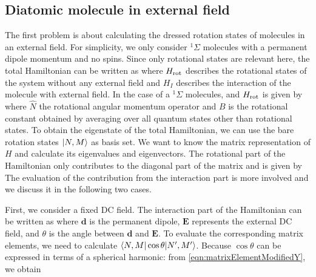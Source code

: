 \subsection{Diatomic molecule in external field}
\label{sec:moleculeInField}
The first problem is about calculating the dressed rotation states of molecules in an external field. For simplicity, we 
only consider $^1\Sigma$ molecules with a permanent dipole momentum and no spins. Since only rotational states are
relevant here, the total Hamiltonian can be written as
where $H_{\rm rot} $ describes the rotational states of the system without any external field 
and $H_{I}$ describes the interaction of the molecule with external field. In the case of a $^1\Sigma$ molecules, and $H_{\rm rot}$ is given by
where $\hat{N}$ the rotational angular momentum operator and $B$ is the rotational constant obtained by averaging 
over all quantum states other than rotational states. To obtain the eigenstate of the total Hamiltonian, we can use the
bare rotation states $| N, M \rangle$ as basis set.  We want to know the matrix representation of $H$ and calculate its 
eigenvalues and eigenvectors. The rotational part of the Hamiltonian only contributes to the diagonal part of the matrix 
and is given by
The evaluation of the contribution from the interaction part is more involved and we discuss it in the following two 
cases.

First, we consider a fixed DC field. The interaction part of the Hamiltonian can be written as
where $\mathbf{d}$ is the permanent dipole, $\mathbf{E}$ represents the external DC field, and $\theta$ is the 
angle between $\mathbf{d}$ and $\mathbf{E}$. To evaluate the corresponding matrix elements, we need to 
calculate $\langle N, M | \cos\theta | N^{\prime}, M^{\prime} \rangle$. Because $\cos\theta$ can be expressed
in terms of a spherical harmonic:
from \autoref{eqn:matrixElementModifiedY}, we obtain


